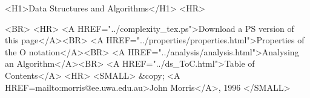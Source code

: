 


\begin{rawhtml}
<H1>Data Structures and Algorithms</H1>
<HR>
\end{rawhtml}



\begin{rawhtml}
<BR>
<HR>
<A HREF="../complexity_tex.ps">Download a PS version of this page</A><BR>
<A HREF="../properties/properties.html">Properties of the O notation</A><BR>
<A HREF="../analysis/analysis.html">Analysing an Algorithm</A><BR>
<A HREF="../ds_ToC.html">Table of Contents</A>
<HR>
<SMALL>
&copy; <A HREF=mailto:morris@ee.uwa.edu.au>John Morris</A>, 1996
</SMALL>
\end{rawhtml}


